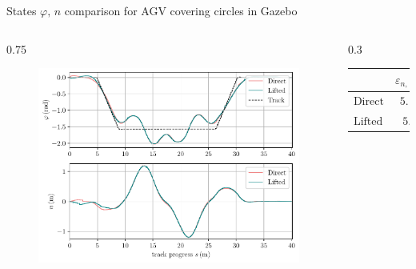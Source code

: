 \documentclass[10pt,aspectratio=1610]{beamer} %
\begin{document}
\begin{frame}{States $\varphi,\,n$ comparison for AGV covering circles in Gazebo}
	\begin{columns}[onlytextwidth]
	
	\begin{column}{0.75\textwidth}
			\begin{figure}[h!tbp]
			\includegraphics[scale=0.65]{figures/zeta_phi_n}
		\end{figure}
	\end{column}
	
	\begin{column}{0.3\textwidth}
		\begin{table}[h!tbp]
			\small
			\begin{center}
				\begin{tabular}{lccccl}\toprule
					& $\varepsilon_{n,\,\mathrm{avg}}\,(\mathrm{m})$\\
					\midrule
					$\mathrm{Direct}$& $5.10\cdot10^{-1}$\\
					$\mathrm{Lifted}$& $5.0\cdot10^{-1}$\\
					\bottomrule
				\end{tabular}
			\end{center}
		\end{table}
	\end{column}
\end{columns}
\end{frame}
\end{document}
